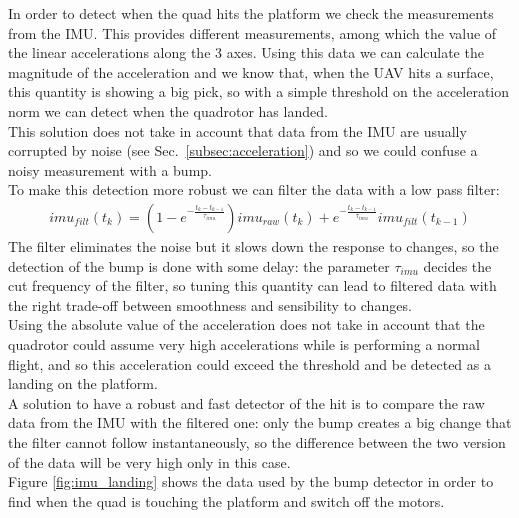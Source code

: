 In order to detect when the quad hits the platform we check the measurements from the IMU. This provides different measurements, among which the value of the linear accelerations along the 3 axes. Using this data we can calculate the magnitude of the acceleration and we know that, when the UAV hits a surface, this quantity is showing a big pick, so with a simple threshold on the acceleration norm we can detect when the quadrotor has landed.\\
This solution does not take in account that data from the IMU are usually corrupted by noise (see Sec.~\ref{subsec:acceleration}) and so we could confuse a noisy measurement with a bump. \\
To make this detection more robust we can filter the data with a low pass filter:
\begin{align}
imu_{filt}(t_k) =  (1-e^{-\frac{t_k-t_{k-1}}{\tau_{imu}}})imu_{raw}(t_k) + e^{-\frac{t_k-t_{k-1}}{\tau_{imu}}} imu_{filt}(t_{k-1})
\label{eq:imu_filtered}
\end{align} 
The filter eliminates the noise but it slows down the response to changes, so the detection of the bump is done with some delay: the parameter $\tau_{imu}$ decides the cut frequency of the filter, so tuning this quantity can lead to filtered data with the right trade-off between smoothness and sensibility to changes.\\  
Using the absolute value of the acceleration does not take in account that the quadrotor could assume very high accelerations while is performing a normal flight, and so this acceleration could exceed the threshold and be detected as a landing on the platform.\\
A solution to have a robust and fast detector of the hit is to compare the raw data from the IMU with the filtered one: only the bump creates a big change that the filter cannot follow instantaneously, so the difference between the two version of the data will be very high only in this case.\\
Figure \ref{fig:imu_landing} shows the data used by the bump detector in order to find when the quad is touching the platform and switch off the motors.


